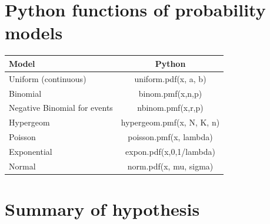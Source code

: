 \documentclass[
]{book}
\begin{document}
\newpage

\hypertarget{python-functions-of-probability-models-1}{%
\section{Python functions of probability models}\label{python-functions-of-probability-models-1}}

\begin{longtable}[]{@{}lc@{}}
\toprule\noalign{}
Model & Python \\
\midrule\noalign{}
\endhead
\bottomrule\noalign{}
\endlastfoot
Uniform (continuous) & uniform.pdf(x, a, b) \\
Binomial & binom.pmf(x,n,p) \\
Negative Binomial for events & nbinom.pmf(x,r,p) \\
Hypergeom & hypergeom.pmf(x, N, K, n) \\
Poisson & poisson.pmf(x, lambda) \\
Exponential & expon.pdf(x,0,1/lambda) \\
Normal & norm.pdf(x, mu, sigma) \\
\end{longtable}

\hypertarget{summary-of-hypothesis}{%
\section{Summary of hypothesis}\label{summary-of-hypothesis}}
\end{document}
